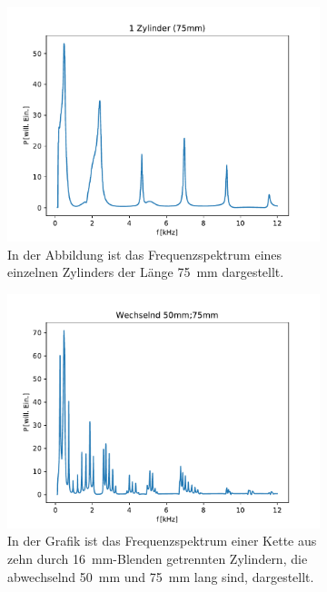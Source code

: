 \begin{figure}[ht]
\begin{subfigure}[b]{0.45\textwidth}
                    \includegraphics[scale=0.45]{./pictures/1_Zylinder_75mm.pdf}
                    \caption{In der Abbildung ist das Frequenzspektrum eines einzelnen Zylinders der Länge \SI{75}{\milli\metre} dargestellt.}
                    \label{fig:1_Zylinder_75mm}
                \end{subfigure}
                \centering
                \begin{subfigure}[b]{0.45\textwidth}
                    \centering
                    \includegraphics[scale=0.45]{./pictures/1dim_10_Zylinder_wechselnd_50_75.pdf}
                    \caption{In der Grafik ist das Frequenzspektrum einer Kette aus zehn durch \SI{16}{\milli\metre}-Blenden getrennten Zylindern, die abwechselnd \SI{50}{\milli\metre} und \SI{75}{\milli\metre} lang sind, dargestellt.}
                    \label{fig:1dim_10_Zylinder_wechselnd_50_75}
                \end{subfigure}
                \caption{ }
                \label{fig:Wechselabbildung}
            \end{figure}
            \FloatBarrier
            
